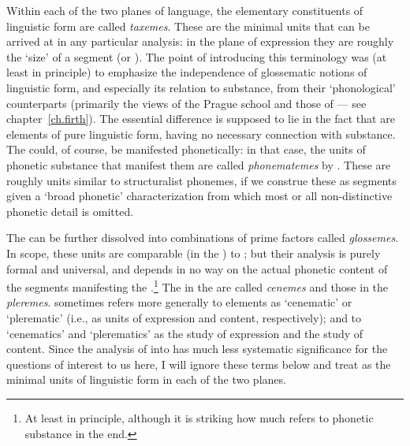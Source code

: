 Within each of the two planes of language, the elementary constituents
of linguistic form are called \emph{taxemes}. These are the minimal
units that can be arrived at in any particular analysis: in the plane
of expression they are roughly the `size' of a segment (or
). The point of introducing this terminology was (at least in
principle) to emphasize the independence of glossematic notions of
linguistic form, and especially its relation to substance, from their
`phonological' counterparts (primarily the views of the Prague school
and those of  --- see chapter~\ref{ch.firth}). The essential
difference is supposed to lie in the fact that  are elements of
pure linguistic form, having no necessary connection with
substance. The  could, of course, be manifested phonetically:
in that case, the units of phonetic substance that manifest them are
called \emph{phonematemes} by {\Hjelmslev}. These are roughly units
similar to structuralist phonemes, if we construe these as segments
given a `broad phonetic' characterization from which most or all
non-distinctive phonetic detail is omitted.

The  can be further dissolved into combinations of prime
factors called \emph{glossemes}. In scope, these units are comparable
(in the ) to ; but their
analysis is purely formal and universal, and depends in no way on the
actual phonetic content of the segments manifesting the
.\footnote{At least in principle, although it is striking how
  much {\Hjelmslev} refers to phonetic substance in the end.} The
 in the  are called \emph{cenemes} and
those in the  \emph{pleremes}. {\Hjelmslev} sometimes
refers more generally to elements as `cenematic' or `plerematic'
(i.e., as units of expression and content, respectively); and to
`cenematics' and `plerematics' as the study of expression and the
study of content. Since the analysis of  into  has
much less systematic significance for the questions of interest to us
here, I will ignore these terms below and treat  as the
minimal units of linguistic form in each of the two planes.

